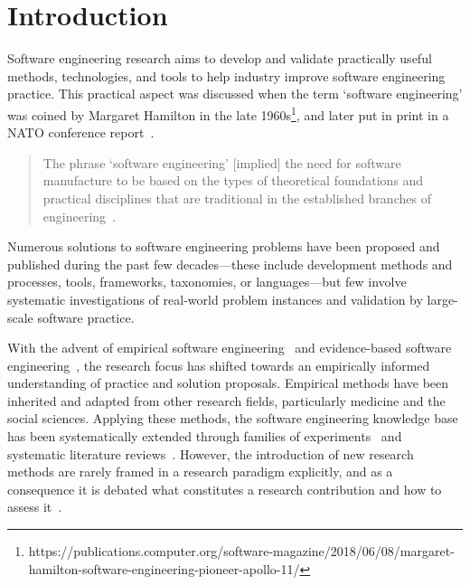 \documentclass[graybox]{svmult}
\begin{document}
\section{Introduction}
\label{sec:intro}

Software engineering research aims to develop and validate practically useful methods, technologies, and tools to help industry improve software engineering practice. This practical aspect was discussed when the term `software engineering' was coined by Margaret Hamilton in the late 1960s\footnote{https://publications.computer.org/software-magazine/2018/06/08/margaret-hamilton-software-engineering-pioneer-apollo-11/}, and later put in print in a NATO conference report~\cite{Nato1968}. 

\begin{quote}
{The phrase `software engineering'  [implied] the need for software manufacture to be based on the types of theoretical foundations and practical disciplines that are traditional in the established branches of engineering}~\cite[p. 13]{Nato1968}. 
\end{quote}

Numerous solutions to software engineering problems have been proposed and published during the past few decades---these include development methods and processes, tools, frameworks, taxonomies, or languages---but few involve systematic investigations of real-world problem instances and validation by large-scale software practice.

With the advent of empirical software engineering~\cite{Basili86} and evidence-based software engineering~\cite{Kitchenham04}, the research focus has shifted towards an empirically informed understanding of practice and solution proposals. Empirical methods have been inherited and adapted from other research fields, particularly medicine and the social sciences. Applying these methods, the software engineering knowledge base has been systematically extended through families of experiments~\cite{Basili99} and systematic literature reviews~\cite{Kitchenham15}. However, the introduction of new research methods are rarely  framed in a research paradigm explicitly, and as a consequence it is debated what constitutes a research contribution and how to assess it~\cite{BriandGeneralization2017}.
\end{document}
